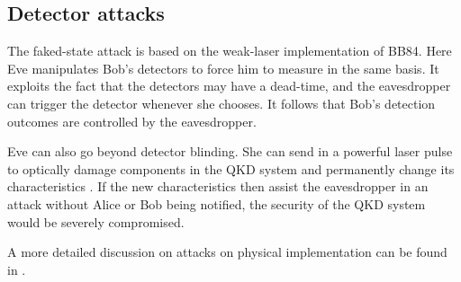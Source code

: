 \subsection{Detector attacks}

The faked-state attack is based on the weak-laser implementation of BB84. Here Eve manipulates Bob's detectors to force him to measure in the same basis. It exploits the fact that the detectors may have a dead-time, and the eavesdropper can trigger the detector whenever she chooses. It follows that Bob's detection outcomes are controlled by the eavesdropper.

Eve can also go beyond detector blinding. She can send in a powerful laser pulse to optically damage components in the QKD system and permanently change its characteristics \cite{bib:jain2016attacks}. If the new characteristics then assist the eavesdropper in an attack without Alice or Bob being notified, the security of the QKD system would be severely compromised.

A more detailed discussion on attacks on physical implementation can be found in \cite{bib:jain2016attacks}.